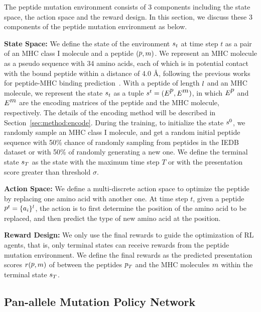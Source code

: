 \documentclass[letterpaper]{article}
\begin{document}
The peptide mutation environment consists of 3 components including the state space, the action space and the reward design.
% 
In this section, we discuss these 3 components of the peptide mutation environment as below.

\textbf{State Space:} 
We define the state of the environment $\mbox{$\mathop{s}\limits$}_t$ at time step $t$ as a pair of an MHC class I molecule and a peptide $(\mbox{$\mathop{p}$}, \mbox{$\mathop{m}$})$.
%
We represent an MHC molecule as a pseudo sequence with 34 amino acids, each of which is in potential contact with the bound peptide within a distance of 4.0 \AA, 
following the previous works for peptide-MHC binding prediction~\cite{Nielsen2007,Jurtz2017}.
%
With a peptide of length $\mbox{$\mathop{l}$}$ and an MHC molecule, we represent the state $\mbox{$\mathop{s}\limits$}_t$ as a tuple $\mbox{$\mathop{s}\limits$}^t=(E^{\mbox{$\mathop{p}$}}, E^{\mbox{$\mathop{m}$}})$, in which $E^{\mbox{$\mathop{p}$}}$ 
and $E^{\mbox{$\mathop{m}$}}$ are the encoding matrices of the peptide and the MHC molecule, respectively.
%
The details of the encoding method will be described in Section~\ref{sec:method:encode}.
%
During the training, to initialize the state $\mbox{$\mathop{s}\limits$}^0$, we randomly sample an MHC class I molecule, and get a random initial peptide sequence with 50\% chance of 
randomly sampling from peptides in the IEDB dataset or with 50\% of randomly generating a new one.
%
We define the terminal state $\mbox{$\mathop{s}\limits$}_T$ as the state with the maximum time step $T$ or with the presentation score greater than threshold $\sigma$.

\textbf{Action Space:} 
We define a multi-discrete action space to optimize the peptide by replacing one amino acid with another one.
%
At time step $t$, given a peptide $\mbox{$\mathop{p}$}^t=\{\mbox{$\mathop{a}$}_i\}^l$, the action is to first determine the position of 
the amino acid to be replaced, and then predict the type of new amino acid at the position. 

\textbf{Reward Design:} 
We only use the final rewards to guide the optimization of RL agents, that is, only terminal states can receive rewards from the peptide mutation environment.
%
We define the final rewards as the predicted presentation scores $r(\mbox{$\mathop{p}$}, \mbox{$\mathop{m}$})$ of \mhcflurrynd between the peptides $\mbox{$\mathop{p}$}_T$ and the MHC molecules 
$\mbox{$\mathop{m}$}$ within the terminal state $\mbox{$\mathop{s}\limits$}_T$.

\subsection{Pan-allele Mutation Policy Network}
\label{sec:method:policy}
\end{document}
